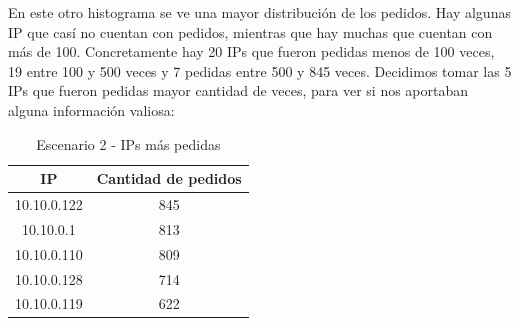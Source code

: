     \par En este otro histograma se ve una mayor distribución de los pedidos. Hay algunas IP que casí no cuentan con pedidos, mientras que hay muchas que cuentan con más de 100. Concretamente hay 20 IPs que fueron pedidas menos de 100 veces, 19 entre 100 y 500 veces y 7 pedidas entre 500 y 845 veces.
    Decidimos tomar las 5 IPs que fueron pedidas mayor cantidad de veces, para ver si nos aportaban alguna información valiosa:
        
    \begin{table}[H]
		\caption{Escenario 2 - IPs más pedidas}
		\centering
		\begin{tabular}{c c}
          IP & Cantidad de pedidos \\
          \hline 
          10.10.0.122 & 845 \\ 
          10.10.0.1 & 813 \\
          10.10.0.110 & 809 \\
          10.10.0.128 & 714 \\
          10.10.0.119 & 622 \\   
  		\end{tabular}
  	\end{table}
    
